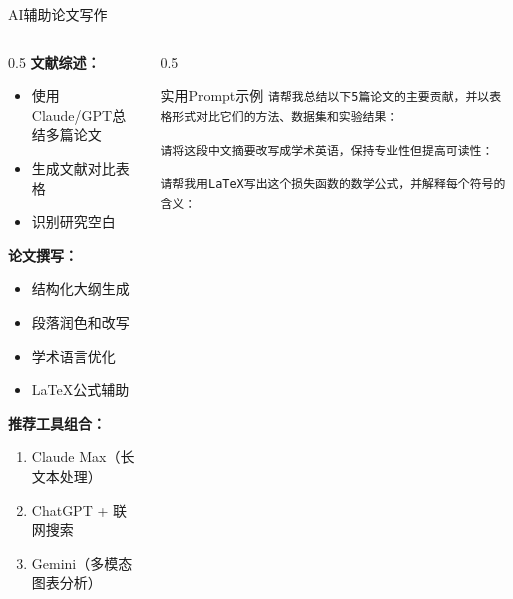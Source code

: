 \documentclass[aspectratio=169,11pt]{beamer}
\begin{document}
\begin{frame}{AI辅助论文写作}
    \begin{columns}
        \begin{column}{0.5\textwidth}
            \textbf{文献综述：}
            \begin{itemize}
                \item 使用Claude/GPT总结多篇论文
                \item 生成文献对比表格
                \item 识别研究空白
            \end{itemize}
            
            \vspace{0.3cm}
            \textbf{论文撰写：}
            \begin{itemize}
                \item 结构化大纲生成
                \item 段落润色和改写
                \item 学术语言优化
                \item LaTeX公式辅助
            \end{itemize}
            
            \vspace{0.3cm}
            \textbf{推荐工具组合：}
            \begin{enumerate}
                \item Claude Max（长文本处理）
                \item ChatGPT + 联网搜索
                \item Gemini（多模态图表分析）
            \end{enumerate}
        \end{column}
        \begin{column}{0.5\textwidth}
            \begin{exampleblock}{实用Prompt示例}
                \small
                \texttt{请帮我总结以下5篇论文的主要贡献，并以表格形式对比它们的方法、数据集和实验结果：}
                
                \vspace{0.2cm}
                \texttt{请将这段中文摘要改写成学术英语，保持专业性但提高可读性：}
                
                \vspace{0.2cm}
                \texttt{请帮我用LaTeX写出这个损失函数的数学公式，并解释每个符号的含义：}
            \end{exampleblock}
            

\end{column}
\end{columns}
\end{frame}
\end{document}
